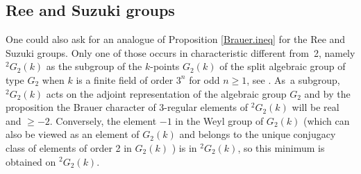 \documentclass[JEP,XML,SOM,Unicode,NoFloatCountersInSection,published]{cedram}
\theoremstyle{definition}
\begin{document}
\subsection*{Ree and Suzuki groups}
One could also ask for an analogue of Proposition \ref{Brauer.ineq} for the Ree and Suzuki groups. Only one of those occurs in characteristic different from~2, namely $^2G_2(k)$ as the subgroup of the $k$-points $G_2(k)$ of the split algebraic group of type $G_2$ when $k$ is a finite field of order $3^n$ for odd $n \ge 1$, see \cite[Ch.\,12--14]{Carter:simple}. As~a subgroup, $^2G_2(k)$ acts on the adjoint representation of the algebraic group $G_2$ and by the proposition the Brauer character of 3-regular elements of $^2G_2(k)$ will be real and $\ge -2$. Conversely, the element $-1$ in the Weyl group of $G_2(k)$ (which can also be viewed as an element of $G_2(k)$ and belongs to the unique conjugacy class of elements of order 2 in $G_2(k)$ \cite[\S4]{Jac:comp}) is in $^2G_2(k)$, so this minimum is obtained on $^2G_2(k)$.

\backmatter


\end{document}
